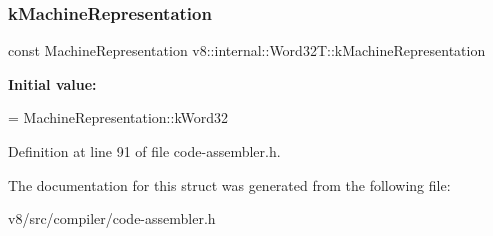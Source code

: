 \subsubsection{\texorpdfstring{k\+Machine\+Representation}{kMachineRepresentation}}
{\footnotesize\ttfamily const Machine\+Representation v8\+::internal\+::\+Word32\+T\+::k\+Machine\+Representation\hspace{0.3cm}{\ttfamily [static]}}

{\bfseries Initial value\+:}
\begin{DoxyCode}
=
      MachineRepresentation::kWord32
\end{DoxyCode}


Definition at line 91 of file code-\/assembler.\+h.



The documentation for this struct was generated from the following file\+:\begin{DoxyCompactItemize}
\item 
v8/src/compiler/code-\/assembler.\+h\end{DoxyCompactItemize}
